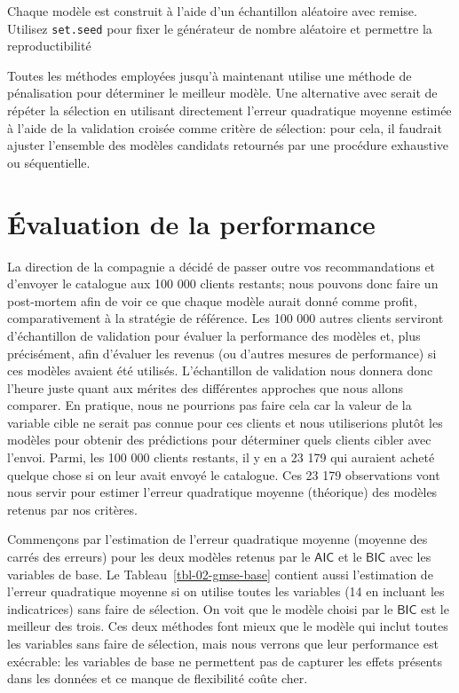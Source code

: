 \documentclass[
  11pt,
  letterpaper,
]{scrbook}
\theoremstyle{definition}
\theoremstyle{remark}
\begin{document}
Chaque modèle est construit à l'aide d'un échantillon aléatoire avec
remise. Utilisez \texttt{set.seed} pour fixer le générateur de nombre
aléatoire et permettre la reproductibilité

Toutes les méthodes employées jusqu'à maintenant utilise une méthode de
pénalisation pour déterminer le meilleur modèle. Une alternative avec
serait de répéter la sélection en utilisant directement l'erreur
quadratique moyenne estimée à l'aide de la validation croisée comme
critère de sélection: pour cela, il faudrait ajuster l'ensemble des
modèles candidats retournés par une procédure exhaustive ou
séquentielle.

\hypertarget{uxe9valuation-de-la-performance}{%
\section{Évaluation de la
performance}\label{uxe9valuation-de-la-performance}}

La direction de la compagnie a décidé de passer outre vos
recommandations et d'envoyer le catalogue aux 100 000 clients restants;
nous pouvons donc faire un post-mortem afin de voir ce que chaque modèle
aurait donné comme profit, comparativement à la stratégie de référence.
Les 100 000 autres clients serviront d'échantillon de validation pour
évaluer la performance des modèles et, plus précisément, afin d'évaluer
les revenus (ou d'autres mesures de performance) si ces modèles avaient
été utilisés. L'échantillon de validation nous donnera donc l'heure
juste quant aux mérites des différentes approches que nous allons
comparer. En pratique, nous ne pourrions pas faire cela car la valeur de
la variable cible ne serait pas connue pour ces clients et nous
utiliserions plutôt les modèles pour obtenir des prédictions pour
déterminer quels clients cibler avec l'envoi. Parmi, les 100 000 clients
restants, il y en a 23 179 qui auraient acheté quelque chose si on leur
avait envoyé le catalogue. Ces 23 179 observations vont nous servir pour
estimer l'erreur quadratique moyenne (théorique) des modèles retenus par
nos critères.

Commençons par l'estimation de l'erreur quadratique moyenne (moyenne des
carrés des erreurs) pour les deux modèles retenus par le
\(\mathsf{AIC}\) et le \(\mathsf{BIC}\) avec les variables de base. Le
Tableau~\ref{tbl-02-gmse-base} contient aussi l'estimation de l'erreur
quadratique moyenne si on utilise toutes les variables (14 en incluant
les indicatrices) sans faire de sélection. On voit que le modèle choisi
par le \(\mathsf{BIC}\) est le meilleur des trois. Ces deux méthodes
font mieux que le modèle qui inclut toutes les variables sans faire de
sélection, mais nous verrons que leur performance est exécrable: les
variables de base ne permettent pas de capturer les effets présents dans
les données et ce manque de flexibilité coûte cher.
\end{document}
